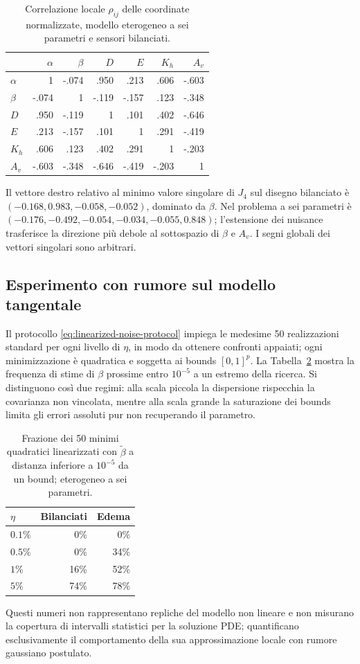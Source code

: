 \begin{table}[H]
\centering\caption{Correlazione locale $\rho_{ij}$ delle coordinate normalizzate, modello eterogeneo a sei parametri e sensori bilanciati.}\label{tab:app-corr}
\scriptsize\setlength{\tabcolsep}{2.3pt}
\begin{tabular}{@{}lrrrrrr@{}}\toprule
&$\alpha$&$\beta$&$D$&$E$&$K_h$&$A_v$\\\midrule
$\alpha$&1&-.074&.950&.213&.606&-.603\\
$\beta$&-.074&1&-.119&-.157&.123&-.348\\
$D$&.950&-.119&1&.101&.402&-.646\\
$E$&.213&-.157&.101&1&.291&-.419\\
$K_h$&.606&.123&.402&.291&1&-.203\\
$A_v$&-.603&-.348&-.646&-.419&-.203&1\\\bottomrule
\end{tabular}
\end{table}
Il vettore destro relativo al minimo valore singolare di $J_4$ sul disegno bilanciato \`e $(-0.168,0.983,-0.058,-0.052)$, dominato da $\beta$. Nel problema a sei parametri \`e $(-0.176,-0.492,-0.054,-0.034,-0.055,0.848)$; l'estensione dei nuisance trasferisce la direzione pi\`u debole al sottospazio di $\beta$ e $A_v$. I segni globali dei vettori singolari sono arbitrari.

\subsection*{Esperimento con rumore sul modello tangentale}
Il protocollo \eqref{eq:linearized-noise-protocol} impiega le medesime 50 realizzazioni standard per ogni livello di $\eta$, in modo da ottenere confronti appaiati; ogni minimizzazione \`e quadratica e soggetta ai bounds $[0,1]^p$. La Tabella~\ref{tab:app-mc-boundaries} mostra la frequenza di stime di $\beta$ prossime entro $10^{-5}$ a un estremo della ricerca. Si distinguono cos\`i due regimi: alla scala piccola la dispersione rispecchia la covarianza non vincolata, mentre alla scala grande la saturazione dei bounds limita gli errori assoluti pur non recuperando il parametro.
\begin{table}[H]
\centering\caption{Frazione dei 50 minimi quadratici linearizzati con $\widetilde\beta$ a distanza inferiore a $10^{-5}$ da un bound; eterogeneo a sei parametri.}\label{tab:app-mc-boundaries}
\small\setlength{\tabcolsep}{5pt}
\begin{tabular}{@{}lrr@{}}\toprule
$\eta$&Bilanciati&Edema\\\midrule
$0.1\%$&0\%&0\%\\
$0.5\%$&0\%&34\%\\
$1\%$&16\%&52\%\\
$5\%$&74\%&78\%\\\bottomrule
\end{tabular}
\end{table}
Questi numeri non rappresentano repliche del modello non lineare e non misurano la copertura di intervalli statistici per la soluzione PDE; quantificano esclusivamente il comportamento della sua approssimazione locale con rumore gaussiano postulato.

